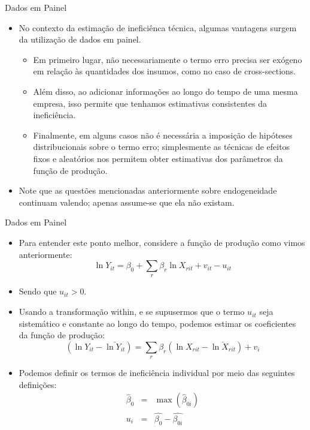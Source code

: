 \documentclass{beamer}
\begin{document}
\begin{frame}{Dados em Painel}

\begin{itemize}
\item No contexto da estimação de ineficiênca técnica, algumas vantagens
surgem da utilização de dados em painel.

\begin{itemize}
\item Em primeiro lugar, não necessariamente o termo erro precisa ser exógeno
em relação às quantidades dos insumos, como no caso de cross-sections. 
\item Além disso, ao adicionar informações ao longo do tempo de uma mesma
empresa, isso permite que tenhamos estimativas consistentes da ineficiência. 
\item Finalmente, em alguns casos não é necessária a imposição de hipóteses
distribucionais sobre o termo erro; simplesmente as técnicas de efeitos
fixos e aleatórios nos permitem obter estimativas dos parâmetros da
função de produção.
\end{itemize}
\item Note que as questões mencionadas anteriormente sobre endogeneidade
continuam valendo; apenas assume-se que ela não existam.
\end{itemize}
\end{frame}

\begin{frame}{Dados em Painel}

\begin{itemize}
\item Para entender este ponto melhor, considere a função de produção como
vimos anteriormente:
\[
\ln Y_{it}=\beta_{0}+\sum_{r}\beta_{r}\ln X_{rit}+v_{it}-u_{it}
\]
\item Sendo que $u_{it}>0$. 
\item Usando a transformação within, e se supusermos que o termo $u_{it}$
seja sistemático e constante ao longo do tempo, podemos estimar os
coeficientes da função de produção:
\[
(\ln Y_{it}-\bar{\ln Y_{it}})=\sum_{r}\beta_{r}(\ln X_{rit}-\bar{\ln X_{rit}})+v_{i}
\]
\item Podemos definir os termos de ineficiência individual por meio das
seguintes definições:
\begin{eqnarray*}
\hat{\beta}_{0} & = & \max(\hat{\beta}_{0i})\\
u_{i} & = & \hat{\beta_{0}}-\hat{\beta_{0i}}
\end{eqnarray*}
\end{itemize}
\end{frame}
\end{document}

